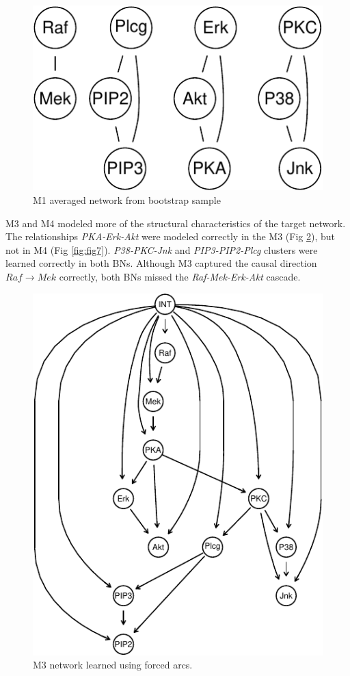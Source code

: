 \documentclass[twocol]{ametsoc}
\begin{document}
\begin{figure}

{\centering \includegraphics{paper_files/figure-latex/fig5-1} 

}

\caption{M1 averaged network from bootstrap sample}\label{fig:fig5}
\end{figure}

M3 and M4 modeled more of the structural characteristics of the target
network. The relationships \emph{PKA-Erk-Akt} were modeled correctly in
the M3 (Fig \ref{fig:fig6}), but not in M4 (Fig \ref{fig:fig7}).
\emph{P38-PKC-Jnk} and \emph{PIP3-PIP2-Plcg} clusters were learned
correctly in both BNs. Although M3 captured the causal direction
\(Raf \to Mek\) correctly, both BNs missed the \emph{Raf-Mek-Erk-Akt}
cascade.

\begin{figure}

{\centering \includegraphics{paper_files/figure-latex/fig6-1} 

}

\caption{M3 network learned using forced arcs.}\label{fig:fig6}
\end{figure}
\end{document}

